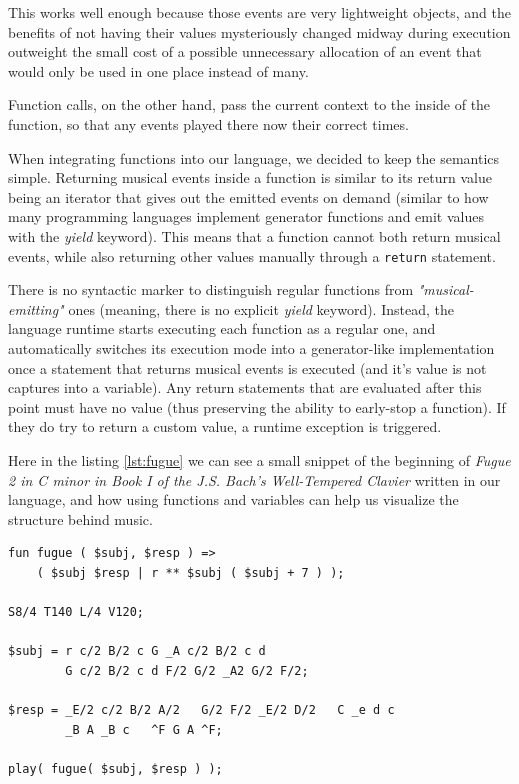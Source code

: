 \documentclass[a4paper,UKenglish,cleveref, autoref]{oasics-v2019}
\begin{document}
This works well enough because those events are very lightweight objects, and the benefits of not having their values mysteriously changed midway during execution outweight the small cost of a possible unnecessary allocation of an event that would only be used in one place instead of many.

Function calls, on the other hand, pass the current context to the inside of the function, so  that any events played there now their correct times.

When integrating functions into our language, we decided to keep the semantics simple. Returning musical events inside a function is similar to its return value being an iterator that gives out the emitted events on demand (similar to how many programming languages implement generator functions and emit values with the \textit{yield} keyword). This means that a function cannot both return musical events, while also returning other values manually through a \texttt{return} statement.

There is no syntactic marker to distinguish regular functions from \textit{"musical-emitting"} ones (meaning, there is no explicit \textit{yield} keyword). Instead, the language runtime starts executing each function as a regular one, and automatically switches its execution mode into a generator-like implementation once a statement that returns musical events is executed (and it's value is not captures into a variable). Any return statements that are evaluated after this point must have no value (thus preserving the ability to early-stop a function). If they do try to return a custom value, a runtime exception is triggered.

Here in the listing \ref{lst:fugue} we can see a small snippet of the beginning of \textit{Fugue 2 in C minor in Book I of the J.S. Bach’s Well-Tempered Clavier} written in our language, and how using functions and variables can help us visualize the structure behind music.

\begin{lstlisting}[label={lst:fugue},caption={Example of repeating the same note},captionpos=t,abovecaptionskip=-\medskipamount]
fun fugue ( $subj, $resp ) => 
    ( $subj $resp | r ** $subj ( $subj + 7 ) );

S8/4 T140 L/4 V120;

$subj = r c/2 B/2 c G _A c/2 B/2 c d
        G c/2 B/2 c d F/2 G/2 _A2 G/2 F/2;

$resp = _E/2 c/2 B/2 A/2   G/2 F/2 _E/2 D/2   C _e d c
        _B A _B c   ^F G A ^F;

play( fugue( $subj, $resp ) );
\end{lstlisting}
\end{document}
